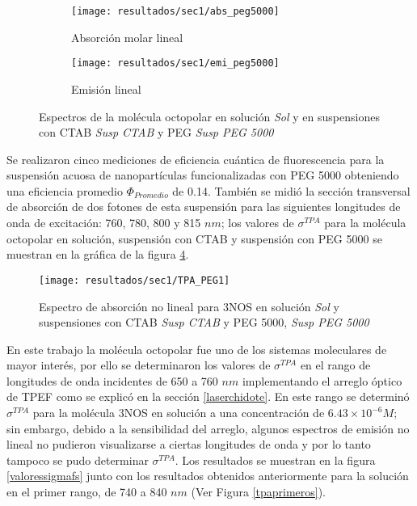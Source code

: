 \begin{figure}
\centering
\begin{subfigure}{0.5\textwidth}
\centering
\texttt{[image: resultados/sec1/abs\_peg5000]}
\caption{Absorci\'on molar lineal }\label{abspeg1}
\end{subfigure}
\begin{subfigure}{0.49\textwidth}
\centering
\texttt{[image: resultados/sec1/emi\_peg5000]}
\caption{Emisi\'on lineal }\label{emipeg1}
\end{subfigure}
\caption{Espectros de la mol\'ecula octopolar en soluci\'on \emph{Sol} y  en suspensiones con CTAB \emph{Susp CTAB} y PEG \emph{Susp PEG 5000}}
\label{grr}
\end{figure}

Se realizaron cinco mediciones de eficiencia cu\'antica de fluorescencia para la suspensi\'on acuosa de nanopart\'iculas funcionalizadas con PEG 5000 obteniendo una eficiencia promedio $\Phi_{Promedio}$ de 0.14. Tambi\'en se midi\'o la secci\'on transversal de absorci\'on de dos fotones de esta suspensi\'on para las siguientes longitudes de onda de excitaci\'on: 760, 780, 800 y 815 $nm$; los valores de $\sigma^{TPA}$ para la mol\'ecula octopolar en soluci\'on, suspensi\'on con CTAB y suspensi\'on con PEG 5000 se muestran en la gr\'afica de la figura \ref{valoressigmapeg1}.

\begin{figure}[h]
\centering
\texttt{[image: resultados/sec1/TPA\_PEG1]}
\caption{Espectro de absorci\'on no lineal para 3NOS en soluci\'on \emph{Sol} y suspensiones con CTAB \emph{Susp CTAB} y PEG 5000, \emph{Susp PEG 5000}}\label{valoressigmapeg1}
\end{figure}

En este trabajo la mol\'ecula octopolar fue uno de los sistemas moleculares  de mayor inter\'es, por ello se determinaron los valores de $\sigma^{TPA}$ en el rango de longitudes de onda incidentes de 650 a 760 $nm$ implementando el arreglo \'optico de TPEF como se explic\'o en la secci\'on \ref{laserchidote}. En este rango se determin\'o $\sigma^{TPA}$ para la mol\'ecula 3NOS en soluci\'on a una concentraci\'on de $6.43 \times 10^{-6} M$; sin embargo, debido a la sensibilidad del arreglo, algunos espectros de emisi\'on no lineal no pudieron visualizarse a ciertas longitudes de onda y por lo tanto tampoco se pudo determinar $\sigma^{TPA}$. Los resultados se muestran en la figura \ref{valoressigmafs} junto con los resultados obtenidos anteriormente para la soluci\'on en el primer rango, de 740 a 840 $nm$ (Ver Figura \ref{tpaprimeros}).

